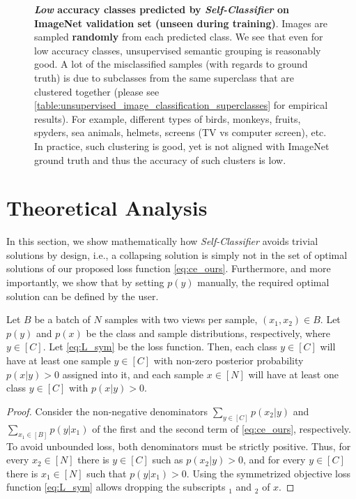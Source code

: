 \documentclass[runningheads]{llncs}
\begin{document}
\begin{figure}[H]
\begin{tabular}{ccccccc}
\end{tabular}
\caption{\textbf{\textit{Low} accuracy classes predicted by \textit{Self-Classifier} on ImageNet validation set (unseen during training)}. Images are sampled \textbf{randomly} from each predicted class. We see that even for low accuracy classes, unsupervised semantic grouping is reasonably good. A lot of the misclassified samples (with regards to ground truth) is due to subclasses from the same superclass that are clustered together (please see \cref{table:unsupervised_image_classification_superclasses} for empirical results). For example, different types of birds, monkeys, fruits, spyders, sea animals, helmets, screens (TV vs computer screen), etc. In practice, such clustering is good, yet is not aligned with ImageNet ground truth and thus the accuracy of such clusters is low.}
\label{fig:low_acc_classes}
\end{figure}

\newpage

\section{Theoretical Analysis}
\label{section:appendix_theoretical}
In this section, we show mathematically how \textit{Self-Classifier} avoids trivial solutions by design, i.e., a collapsing solution is simply not in the set of optimal solutions of our proposed loss function \cref{eq:ce_ours}. Furthermore, and more importantly, we show that by setting $p(y)$ manually, the required optimal solution can be defined by the user.

\begin{theorem}
\label{theorem:appendix_non_zero_prob}
Let $B$ be a batch of $N$ samples with two views per sample, $(x_1, x_2) \in B$. Let $p(y)$ and $p(x)$ be the class and sample distributions, respectively, where $y \in [C]$. Let \cref{eq:L_sym} be the loss function. Then, each class $y \in [C]$ will have at least one sample $y \in [C]$ with non-zero posterior probability $p(x|y) > 0$ assigned into it, and each sample $x \in [N]$ will have at least one class  $y \in [C]$ with $p(x|y) > 0$.
\end{theorem}

\begin{proof}
Consider the non-negative denominators $\sum_{y \in [C]}{p(x_2|y)}$ and $\sum_{x_1 \in [B]}{p(y|x_1)}$ of the first and the second term of \cref{eq:ce_ours}, respectively. To avoid unbounded loss, both denominators must be strictly positive. Thus, for every $x_2 \in [N]$ there is $y \in [C]$ such as $p(x_2|y) > 0$, and for every $y \in [C]$ there is $x_1 \in [N]$ such that $p(y|x_1) > 0$.
Using the symmetrized objective loss function \cref{eq:L_sym} allows dropping the subscripts $_1$ and $_2$ of $x$.
\end{proof}
\end{document}
